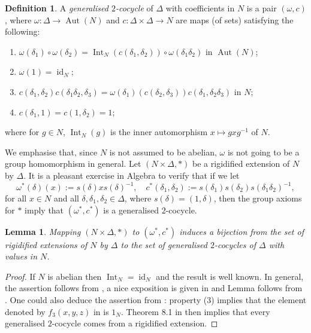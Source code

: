 \documentclass{amsart}
\newtheorem{lem}[prop]{Lemma}
\theoremstyle{definition}
\newtheorem{defi}[prop]{Definition}
\theoremstyle{remark}
\DeclareMathOperator{\Aut}{Aut}
\DeclareMathOperator{\id}{id}
\newcommand{\Int}{\operatorname{Int}}
\begin{document}
\begin{defi}\label{defi_gen_two_cocyc} A \emph{generalised $2$-cocycle} of $\Delta$ with coefficients in $N$ is a
pair $(\omega, c)$, where $\omega: \Delta\rightarrow \Aut(N)$ and $c: \Delta\times \Delta\rightarrow N$ 
are maps (of sets) satisfying the following:
\begin{enumerate}
        \item $\omega(\delta_1) \circ \omega(\delta_2) = \Int_{N}(c(\delta_1, \delta_2)) \circ \omega(\delta_1\delta_2)$ in $\Aut(N)$;
        \item $\omega(1) = \id_{N}$;
        \item $c(\delta_1,\delta_2)c(\delta_1\delta_2, \delta_3) = \omega(\delta_1)(c(\delta_2, \delta_3)) c(\delta_1, \delta_2\delta_3)$ in $N$;
        \item $c(\delta_1, 1) = c(1,\delta_2) = 1$;
    \end{enumerate}
where for $g\in N$, $\Int_N(g)$  is the inner automorphism $x \mapsto gxg^{-1}$ of $N$.
\end{defi}
We emphasise that, since $N$ is not assumed to be abelian, $\omega$ is not going to be a group homomorphism 
in general. Let $(N\times \Delta, \ast)$ be a rigidified extension of $N$ by $\Delta$. It is a pleasant 
exercise in Algebra to verify that if we let
$$ \omega^{\ast}(\delta)(x):= s(\delta) x s(\delta)^{-1}, \quad c^{\ast}(\delta_1, \delta_2):= 
s(\delta_1)s(\delta_2)s(\delta_1 \delta_2)^{-1},$$
for all $x\in N$ and all $\delta, \delta_1, \delta_2\in \Delta$, where $s(\delta)= (1, \delta)$,
then the group axioms for $\ast$ imply that  $(\omega^{\ast}, c^{\ast})$ is a generalised $2$-cocycle.


\begin{lem}\label{gen2cocycle} Mapping $(N\times \Delta, \ast)$ to $(\omega^{\ast}, c^{\ast})$ induces 
a bijection from the set of rigidified extensions of $N$ by $\Delta$ to the set of 
 generalised $2$-cocycles of $\Delta$ with values in $N$. 
\end{lem}
\begin{proof} If $N$ is abelian then $\Int_N =\id_N$ and the result is well known. In 
general, the assertion follows from \cite[Satz I]{schreier}, a nice exposition is given 
in \cite[Section 2.2]{zhang_bachelor} and Lemma follows from \cite[Lemma 2.11]{zhang_bachelor}.
One could also deduce the assertion from 
\cite{EilMac}: property (3) implies that the element denoted by $f_3(x,y,z)$ in 
\cite[Section 7]{EilMac} is $1_N$. Theorem 8.1 in \cite{EilMac} then implies that 
every  generalised $2$-cocycle comes from a rigidified extension. 
\end{proof} 
\end{document}

